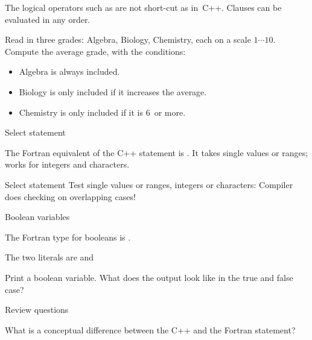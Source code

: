 The logical operators such as  are not short-cut as
in~C++. Clauses can be evaluated in any order.

\begin{exercise}
  Read in three grades: Algebra, Biology, Chemistry, each on a scale
  $1\cdots 10$. Compute the average grade, with the conditions:
  \begin{itemize}
  \item Algebra is always included.
  \item Biology is only included if it increases the average.
  \item Chemistry is only included if it is 6~or more.
  \end{itemize}
\end{exercise}

 {Select statement}

The Fortran equivalent of the C++  statement is . It takes
single values or ranges; works for integers and characters.

\begin{block}{Select statement}
  \label{sl:fswitch}
  Test single values or ranges, integers or characters:
  Compiler does checking on overlapping cases!
\end{block}

 {Boolean variables}

The Fortran type for booleans is .

The two literals are  and 

\begin{exercise}
  \label{ex:fprintbool}
  Print a boolean variable. What does the output look like in the true
  and false case?
\end{exercise}

 {Review questions}

\begin{exercise}
  \label{ex:select-vs-switch}
  What is a conceptual difference between the C++  and the
  Fortran  statement?
\end{exercise}
